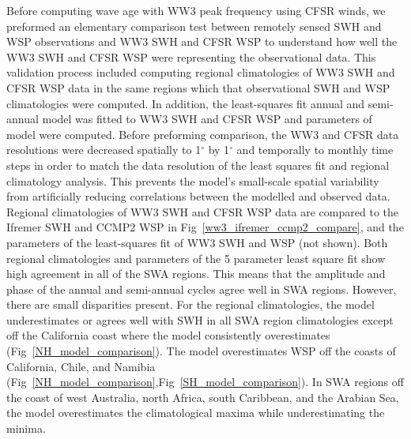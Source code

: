 \documentclass[draft,linenumbers]{agujournal2018}
\begin{document}

Before computing wave age with WW3 peak frequency using CFSR winds, we preformed an elementary comparison test between remotely sensed SWH and WSP observations and WW3 SWH and CFSR WSP to understand how well the WW3 SWH and CFSR WSP were representing the observational data. This validation process included computing regional climatologies of WW3 SWH and CFSR WSP data in the same regions which that observational SWH and WSP climatologies were computed. In addition, the least-squares fit annual and semi-annual model was fitted to WW3 SWH and CFSR WSP and parameters of model were computed. Before preforming comparison, the WW3 and CFSR data resolutions were decreased spatially to 1$^{\circ}$ by 1$^{\circ}$ and temporally to monthly time steps in order to match the data resolution of the least squares fit and regional climatology analysis. This prevents the model's small-scale spatial variability from artificially reducing correlations between the modelled and observed data. Regional climatologies of WW3 SWH and CFSR WSP data are compared to the Ifremer SWH and CCMP2 WSP in Fig~\ref{ww3_ifremer_ccmp2_compare}, and the parameters  of the least-squares fit of WW3 SWH and WSP (not shown). Both regional climatologies and parameters of the 5 parameter least square fit show high agreement in all of the SWA regions. This means that the amplitude and phase of the annual and semi-annual cycles agree well in SWA regions. However, there are small disparities present. For the regional climatologies, the model underestimates or agrees well with SWH in all SWA region climatologies except off the California coast where the model consistently overestimates (Fig~\ref{NH_model_comparison}). The model overestimates WSP off the coasts of California, Chile, and Namibia (Fig~\ref{NH_model_comparison},Fig~\ref{SH_model_comparison}). In SWA regions off the coast of west Australia, north Africa, south Caribbean, and the Arabian Sea, the model overestimates the climatological maxima while underestimating the minima. 
\end{document}
